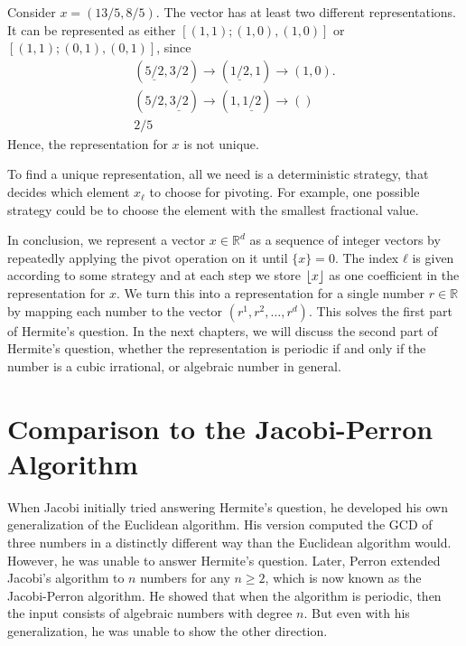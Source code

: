 
\begin{example}
  Consider $x = (13/5, 8/5)$.
  The vector has at least two different representations.
  It can be represented as either $[(1,1); (1, 0), (1, 0)]$ or $[(1,1); (0, 1), (0, 1)]$,
  since
  \begin{align*}
    (\underline{5/2}, 3/2) → (\underline{1/2}, 1) → (1, 0). \\
    (5/2, \underline{3/2}) → (1, \underline{1/2}) → () \\
    2/5
  \end{align*}
  Hence, the representation for $x$ is not unique.
\end{example}

To find a unique representation, all we need is a deterministic strategy,
that decides which element $x_ℓ$ to choose for pivoting.
For example, one possible strategy could be to choose the element with the
smallest fractional value.

In conclusion,
we represent a vector $x ∈ ℝ^d$ as a sequence of integer vectors by repeatedly
applying the $\mathrm{pivot}$ operation on it until $\{x\} = 0$.
The index $ℓ$ is given according to some strategy and at each step we store
$\left\lfloor x\right\rfloor$ as one coefficient in the representation for $x$.
We turn this into a representation for a single number $r ∈ ℝ$ by mapping each
number to the vector $(r^1, r^2, …, r^d)$.
This solves the first part of Hermite's question.
In the next chapters, we will discuss the second part of Hermite's question,
whether the representation is periodic if and only if the number is a cubic
irrational, or algebraic number in general.

\section{Comparison to the Jacobi-Perron Algorithm}

When Jacobi \cite{Jacobi68} initially tried answering Hermite's question,
he developed his own generalization of the Euclidean algorithm.
His version computed the GCD of three numbers in a distinctly different way
than the Euclidean algorithm would.
However, he was unable to answer Hermite's question.
Later, Perron \cite{Perron07} extended Jacobi's algorithm to $n$ numbers for any $n ≥ 2$,
which is now known as the Jacobi-Perron algorithm.
He showed that when the algorithm is periodic, then the input consists of
algebraic numbers with degree $n$.
But even with his generalization, he was unable to show the other direction.


